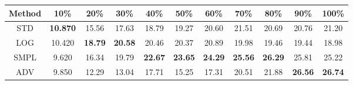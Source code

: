 \documentclass{standalone}
\begin{document}
\begin{tabular}{c|cccccccccc}
      \toprule
      Method & 10\% & 20\% & 30\% & 40\% & 50\% & 60\% & 70\% & 80\% & 90\% & 100\% \\
      \midrule
STD & \textbf{10.870} & 15.56 & 17.63 & 18.79 & 19.27 & 20.60 & 21.51 & 20.69 & 20.76 & 21.20\\
LOG & 10.420 & \textbf{18.79} & \textbf{20.58} & 20.46 & 20.37 & 20.89 & 19.98 & 19.46 & 19.44 & 18.98\\
SMPL & 9.620 & 16.34 & 19.79 & \textbf{22.67} & \textbf{23.65} & \textbf{24.29} & \textbf{25.56} & \textbf{26.29} & 25.81 & 25.22\\
ADV & 9.850 & 12.29 & 13.04 & 17.71 & 15.25 & 17.31 & 20.51 & 21.88 & \textbf{26.56} & \textbf{26.74}\\
  \bottomrule
\end{tabular}
\end{document}
